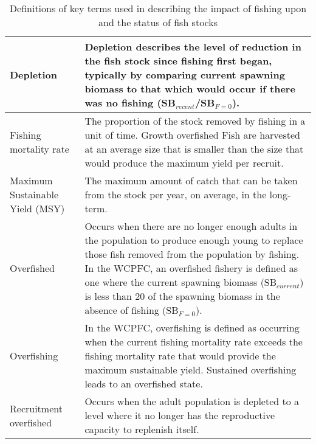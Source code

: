 \begin{table}[h]
\caption{Definitions of key terms used in describing the impact of fishing upon and the status of fish stocks}
\begin{tabular}{ | p{5cm} | p{10cm} |}
\hline
Depletion & Depletion describes the level of reduction in the fish stock since fishing
first began, typically by comparing current spawning biomass to that
which would occur if there was no fishing (SB$_{recent}$/SB$_{F =0}$). \\ \hline
Fishing mortality rate & The proportion of the stock removed by fishing in a unit of time.
Growth overfished Fish are harvested at an average size that is smaller than the size that
would produce the maximum yield per recruit. \\ \hline
Maximum Sustainable Yield (MSY) & The maximum amount of catch that can be taken from the stock per
year, on average, in the long-term. \\ \hline
Overfished & Occurs when there are no longer enough adults in the population to
produce enough young to replace those fish removed from the population
by fishing. In the WCPFC, an overfished fishery is defined as one
where the current spawning biomass (SB$_{current}$) is less than 20 of the
spawning biomass in the absence of fishing (SB$_{F =0}$). \\ \hline
Overfishing & In the WCPFC, overfishing is defined as occurring when the current
fishing mortality rate exceeds the fishing mortality rate that would
provide the maximum sustainable yield. Sustained overfishing leads to
an overfished state. \\ \hline
Recruitment overfished & Occurs when the adult population is depleted to a level where it no longer has the reproductive capacity to replenish itself. \\
\hline
\end{tabular}
\label{expl_table}
\end{table}